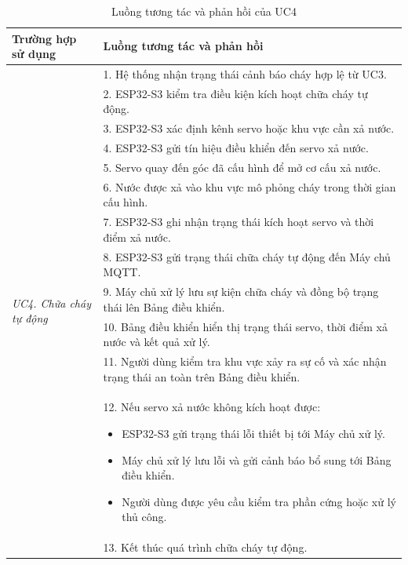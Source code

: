 \documentclass[a4paper,12pt]{article}
\begin{document}
\begin{table}[H]
\centering
\small
\caption{Luồng tương tác và phản hồi của UC4}
\begin{tabularx}{\linewidth}{|p{4cm}|X|}
\hline
\textbf{Trường hợp sử dụng} &
\textbf{Luồng tương tác và phản hồi} \\
\hline

\multirow{13}{=}{\parbox{3.6cm}{\centering\textit{UC4. Chữa cháy\\tự động}}}
&
1. Hệ thống nhận trạng thái cảnh báo cháy hợp lệ từ UC3. \\

&
2. ESP32-S3 kiểm tra điều kiện kích hoạt chữa cháy tự động. \\

&
3. ESP32-S3 xác định kênh servo hoặc khu vực cần xả nước. \\

&
4. ESP32-S3 gửi tín hiệu điều khiển đến servo xả nước. \\

&
5. Servo quay đến góc đã cấu hình để mở cơ cấu xả nước. \\

&
6. Nước được xả vào khu vực mô phỏng cháy trong thời gian cấu hình. \\

&
7. ESP32-S3 ghi nhận trạng thái kích hoạt servo và thời điểm xả nước. \\

&
8. ESP32-S3 gửi trạng thái chữa cháy tự động đến Máy chủ MQTT. \\

&
9. Máy chủ xử lý lưu sự kiện chữa cháy và đồng bộ trạng thái lên Bảng điều khiển. \\

&
10. Bảng điều khiển hiển thị trạng thái servo, thời điểm xả nước và kết quả xử lý. \\

&
11. Người dùng kiểm tra khu vực xảy ra sự cố và xác nhận trạng thái an toàn trên Bảng điều khiển. \\

&
12. Nếu servo xả nước không kích hoạt được:
\begin{itemize}
    \item ESP32-S3 gửi trạng thái lỗi thiết bị tới Máy chủ xử lý.
    \item Máy chủ xử lý lưu lỗi và gửi cảnh báo bổ sung tới Bảng điều khiển.
    \item Người dùng được yêu cầu kiểm tra phần cứng hoặc xử lý thủ công.
\end{itemize}
\\

&
13. Kết thúc quá trình chữa cháy tự động. \\
\hline

\end{tabularx}
\end{table}
\end{document}
